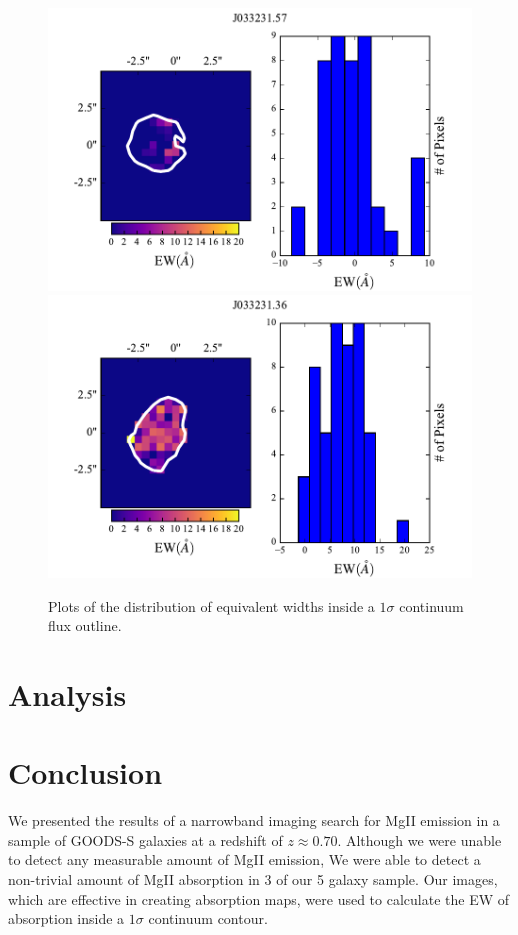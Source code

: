 \documentclass[twocolumn]{aastex6}
\begin{document}
\begin{figure}[ht!]
\includegraphics[scale=.58]{J57EW.pdf}
\includegraphics[scale=.58]{J36EW.pdf}
\caption{ Plots of the distribution of equivalent widths inside a $1\sigma$ continuum flux outline. }
\label{fig:ew_images}
\end{figure}

\section{Analysis}
\section{Conclusion}
We presented the results of a narrowband imaging search for MgII emission in a sample of GOODS-S galaxies at a redshift of $z \approx 0.70$. Although we were unable to detect any measurable amount of MgII emission, We were able to detect a non-trivial amount of MgII absorption in 3 of our 5 galaxy sample. Our images, which are effective in creating absorption maps, were used to calculate the EW of absorption inside a $1\sigma$ continuum contour. 

\end{document}
